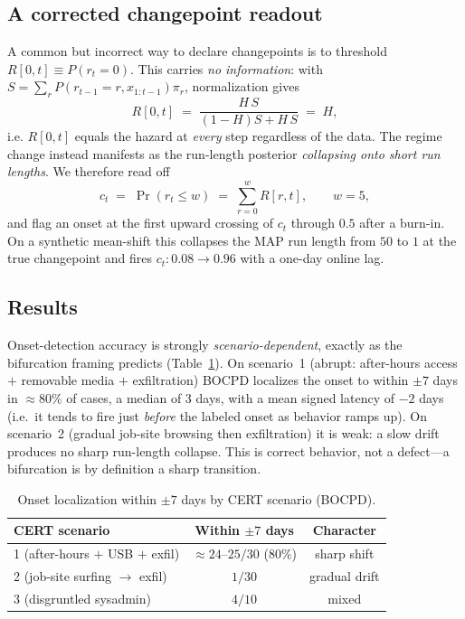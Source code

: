 \documentclass[11pt]{article}
\begin{document}
\subsection{A corrected changepoint readout}
A common but incorrect way to declare changepoints is to threshold
$R[0,t]\equiv P(r_t=0)$. This carries \emph{no information}: with
$S=\sum_r P(r_{t-1}{=}r,x_{1:t-1})\pi_r$, normalization gives
\begin{equation}
  R[0,t] \;=\; \frac{H\,S}{(1-H)S + H\,S} \;=\; H ,
\end{equation}
i.e. $R[0,t]$ equals the hazard at \emph{every} step regardless of the
data. The regime change instead manifests as the run-length posterior
\emph{collapsing onto short run lengths}. We therefore read off
\begin{equation}
  c_t \;=\; \Pr(r_t \le w) \;=\; \sum_{r=0}^{w} R[r,t],
  \qquad w=5,
\end{equation}
and flag an onset at the first upward crossing of $c_t$ through $0.5$ after
a burn-in. On a synthetic mean-shift this collapses the MAP run length from
$50$ to $1$ at the true changepoint and fires $c_t:0.08\!\to\!0.96$ with a
one-day online lag.

\subsection{Results}
Onset-detection accuracy is strongly \emph{scenario-dependent}, exactly as
the bifurcation framing predicts (Table~\ref{tab:bocpd}). On scenario~1
(abrupt: after-hours access $+$ removable media $+$ exfiltration) BOCPD
localizes the onset to within $\pm 7$ days in $\approx 80\%$ of cases, a
median of $3$ days, with a mean signed latency of $-2$ days (i.e.\ it
tends to fire just \emph{before} the labeled onset as behavior ramps up).
On scenario~2 (gradual job-site browsing then exfiltration) it is weak: a
slow drift produces no sharp run-length collapse. This is correct
behavior, not a defect---a bifurcation is by definition a sharp
transition.

\begin{table}[t]
  \centering
  \caption{Onset localization within $\pm 7$ days by CERT scenario (BOCPD).}
  \label{tab:bocpd}
  \begin{tabular}{lcc}
    \toprule
    CERT scenario & Within $\pm 7$ days & Character \\
    \midrule
    1 (after-hours $+$ USB $+$ exfil) & $\approx 24$--$25/30$ ($80\%$) & sharp shift \\
    2 (job-site surfing $\rightarrow$ exfil) & $1/30$ & gradual drift \\
    3 (disgruntled sysadmin) & $4/10$ & mixed \\
    \bottomrule
  \end{tabular}
\end{table}
\end{document}
